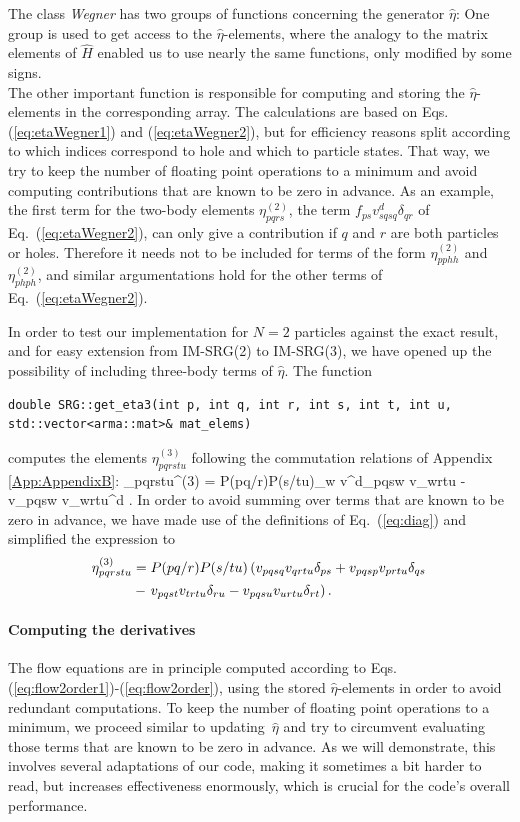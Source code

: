The class \textit{Wegner} has two groups of functions concerning the generator $\hat{\eta}$: One group  is used to get access to the $\hat{\eta}$-elements, where the analogy to the matrix elements of $\hat{H}$ enabled us to use nearly the same functions, only modified by some signs. \\
The other important function is responsible for computing and storing the $\hat{\eta}$-elements in the corresponding array. The calculations are based on Eqs. (\ref{eq:etaWegner1}) and (\ref{eq:etaWegner2}), but for efficiency reasons split according to which indices correspond to hole and which to particle states. That way, we try to keep the number of floating point operations to a minimum and avoid computing
 contributions that are known to be zero in advance. As an example, the first term for the two-body elements $\eta_{pqrs}^{(2)}$, the term $f_{ps}v^d_{sqsq}\delta_{qr}$ of Eq.~(\ref{eq:etaWegner2}), can only give a contribution if $q$ and $r$ are both particles or holes. Therefore it needs not to be included for terms of the form $\eta_{pphh}^{(2)}$ and $\eta_{phph}^{(2)}$, and similar argumentations hold for the other terms of Eq.~(\ref{eq:etaWegner2}).


In order to test our implementation for $N=2$ particles against the exact result, and for easy extension from IM-SRG(2) to IM-SRG(3), we have opened up the possibility of including three-body terms of $\hat{\eta}$. The function
\begin{lstlisting}[backgroundcolor=\color{lighter-gray},numbers=none]
double SRG::get_eta3(int p, int q, int r, int s, int t, int u, std::vector<arma::mat>& mat_elems)
\end{lstlisting}
computes the elements $\eta_{pqrstu}^{(3)}$ following 
the commutation relations of Appendix \ref{App:AppendixB}:
\be
\eta_{pqrstu}^{(3)} = P(pq/r)P(s/tu)\sum_w \lb v^d_{pqsw} v_{wrtu} - v_{pqsw} v_{wrtu}^d \rb.
\label{eq:eta3order}
\ee
In order to avoid summing over terms that are known to be zero in advance, we have made 
use of the definitions of Eq.~(\ref{eq:diag}) and simplified the expression to
\begin{align}
\eta_{pqrstu}^{(3)} &= P(pq/r)P(s/tu)\lb v_{pqsq}v_{qrtu}\delta_{ps} + v_{pqsp}v_{prtu}\delta_{qs} \right. \notag\\
& - \left. v_{pqst}v_{trtu}\delta_{ru} - v_{pqsu}v_{urtu}\delta_{rt}\rb.
\label{eq:eta3orderSim}
\end{align}

\paragraph{Computing the derivatives}
The flow equations are in principle computed according to Eqs. (\ref{eq:flow2order1})-(\ref{eq:flow2order}), using the stored $\hat{\eta}$-elements in order to avoid redundant computations.  To keep the number of floating point operations to a minimum, we proceed similar to \mbox{updating  $\hat{\eta}$} and try to circumvent evaluating those terms that are known to be zero in advance. As we will demonstrate, this involves several adaptations of our code, making it sometimes a bit harder to read, but increases effectiveness enormously, which is crucial for the code's overall performance. 


